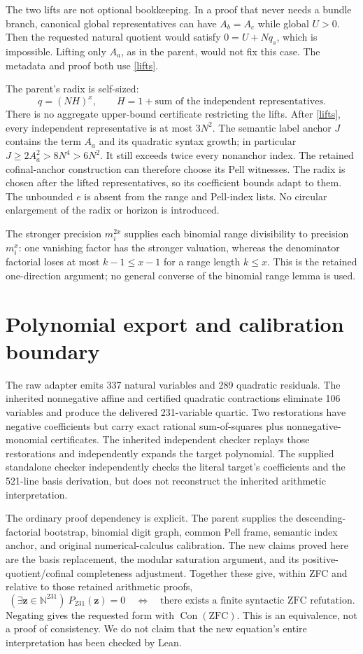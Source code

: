 \documentclass[11pt]{article}
\newcommand{\NN}{\mathbb N}
\newcommand{\Con}{\operatorname{Con}}
\begin{document}
The two lifts are not optional bookkeeping. In a proof that never needs a
bundle branch, canonical global representatives can have $A_b=A_c$ while
global $U>0$. Then the requested natural quotient would satisfy
$0=U+Nq_s$, which is impossible. Lifting only $A_a$, as in the parent,
would not fix this case. The metadata and proof both use \eqref{lifts}.

The parent's radix is self-sized:
\[
 q=(NH)^x,\qquad H=1+\text{sum of the independent representatives}.
\]
There is no aggregate upper-bound certificate restricting the lifts.
After \eqref{lifts}, every independent representative is at most $3N^2$.
The semantic label anchor $J$ contains the term $A_a$ and its quadratic
syntax growth; in particular $J\ge2A_a^2>8N^4>6N^2$. It still exceeds
twice every nonanchor index. The retained cofinal-anchor construction can
therefore choose its Pell witnesses. The radix is chosen after the lifted
representatives, so its coefficient bounds adapt to them. The unbounded
$e$ is absent from the range and Pell-index lists. No circular enlargement
of the radix or horizon is introduced.

The stronger precision $m_i^{2x}$ supplies each binomial range divisibility
to precision $m_i^x$: one vanishing factor has the stronger valuation,
whereas the denominator factorial loses at most $k-1\le x-1$ for a range
length $k\le x$. This is the retained one-direction argument; no general
converse of the binomial range lemma is used.

\section{Polynomial export and calibration boundary}

The raw adapter emits 337 natural variables and 289 quadratic residuals.
The inherited nonnegative affine and certified quadratic contractions
eliminate 106 variables and produce the delivered 231-variable quartic.
Two restorations have negative coefficients but carry exact rational
sum-of-squares plus nonnegative-monomial certificates. The inherited
independent checker replays those restorations and independently expands
the target polynomial. The supplied standalone checker independently checks
the literal target's coefficients and the 521-line basis derivation, but
does not reconstruct the inherited arithmetic interpretation.

The ordinary proof dependency is explicit. The parent supplies the
descending-factorial bootstrap, binomial digit graph, common Pell frame,
semantic index anchor, and original numerical-calculus calibration. The
new claims proved here are the basis replacement, the modular saturation
argument, and its positive-quotient/cofinal completeness adjustment.
Together these give, within ZFC and relative to those retained arithmetic
proofs,
\[
 (\exists\boldsymbol z\in\NN^{231})\ P_{231}(\boldsymbol z)=0
 \quad\Longleftrightarrow\quad
 \text{there exists a finite syntactic ZFC refutation}.
\]
Negating gives the requested form with $\Con(\mathrm{ZFC})$.
This is an equivalence, not a proof of consistency. We do not claim that
the new equation's entire interpretation has been checked by Lean.
\end{document}
